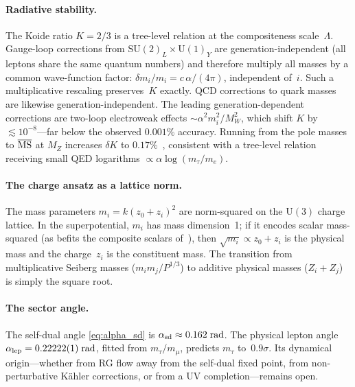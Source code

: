 \documentclass[12pt,a4paper]{article}
\newcommand{\SU}{\mathrm{SU}}
\newcommand{\UU}{\mathrm{U}}
\begin{document}
\paragraph{Radiative stability.}
The Koide ratio $K = 2/3$ is a tree-level relation at the
compositeness scale~$\Lambda$.  Gauge-loop corrections from
$\SU(2)_L \times \UU(1)_Y$ are generation-independent (all leptons
share the same quantum numbers) and therefore multiply all masses by a
common wave-function factor: $\delta m_i / m_i = c\,\alpha/(4\pi)$,
independent of~$i$.  Such a multiplicative rescaling preserves~$K$
exactly.  QCD corrections to quark masses are likewise
generation-independent.  The leading generation-dependent corrections
are two-loop electroweak effects $\sim \alpha^2 m_i^2/M_W^2$, which
shift $K$ by $\lesssim 10^{-8}$---far below the observed $0.001\%$
accuracy.  Running from the pole masses to $\overline{\rm MS}$ at
$M_Z$ increases $\delta K$ to $0.17\%$~\cite{AntuschHinzeSaad:2025},
consistent with a tree-level relation receiving small QED logarithms
$\propto \alpha\log(m_\tau/m_e)$.

\paragraph{The charge ansatz as a lattice norm.}
The mass parameters $m_i = k(z_0{+}z_i)^2$ are norm-squared on the
$\UU(3)$ charge lattice. In the superpotential, $m_i$ has mass
dimension~1; if it encodes scalar mass-squared (as befits the composite
scalars of~\cite{Rivero:2024epjc}), then
$\sqrt{m_i} \propto z_0{+}z_i$ is the physical mass and the charge~$z_i$
is the constituent mass. The transition from multiplicative Seiberg
masses ($m_i m_j/P^{1/3}$) to additive physical masses
($Z_i + Z_j$) is simply the square root.

\paragraph{The sector angle.}
The self-dual angle \eqref{eq:alpha_sd} is $\alpha_{\rm sd} \approx
0.162\;\text{rad}$.  The physical lepton angle
$\alpha_{\rm lep} = 0.22222(1)\;\text{rad}$, fitted from
$m_\tau/m_\mu$, predicts $m_\tau$ to~$0.9\sigma$.  Its dynamical
origin---whether from RG flow away from the self-dual fixed point, from
non-perturbative K\"ahler corrections, or from a UV
completion---remains open.
\end{document}
